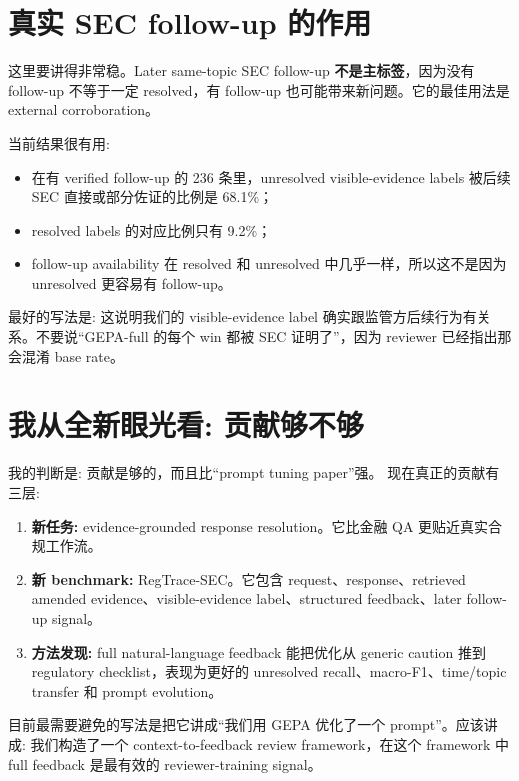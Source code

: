 \documentclass[11pt,fontset=none]{ctexart}
\newcommand{\good}[1]{\textcolor{blue!70!black}{#1}}
\begin{document}
\section*{真实 SEC follow-up 的作用}

这里要讲得非常稳。Later same-topic SEC follow-up \textbf{不是主标签}，因为没有 follow-up 不等于一定 resolved，有 follow-up 也可能带来新问题。它的最佳用法是 external corroboration。

当前结果很有用:
\begin{itemize}
    \item 在有 verified follow-up 的 236 条里，unresolved visible-evidence labels 被后续 SEC 直接或部分佐证的比例是 68.1\%；
    \item resolved labels 的对应比例只有 9.2\%；
    \item follow-up availability 在 resolved 和 unresolved 中几乎一样，所以这不是因为 unresolved 更容易有 follow-up。
\end{itemize}

最好的写法是: 这说明我们的 visible-evidence label 确实跟监管方后续行为有关系。不要说``GEPA-full 的每个 win 都被 SEC 证明了''，因为 reviewer 已经指出那会混淆 base rate。

\section*{我从全新眼光看: 贡献够不够}

我的判断是: \good{贡献是够的，而且比``prompt tuning paper''强。} 现在真正的贡献有三层:

\begin{enumerate}[leftmargin=1.6em,itemsep=0.25em]
    \item \textbf{新任务:} evidence-grounded response resolution。它比金融 QA 更贴近真实合规工作流。
    \item \textbf{新 benchmark:} RegTrace-SEC。它包含 request、response、retrieved amended evidence、visible-evidence label、structured feedback、later follow-up signal。
    \item \textbf{方法发现:} full natural-language feedback 能把优化从 generic caution 推到 regulatory checklist，表现为更好的 unresolved recall、macro-F1、time/topic transfer 和 prompt evolution。
\end{enumerate}

目前最需要避免的写法是把它讲成``我们用 GEPA 优化了一个 prompt''。应该讲成: \good{我们构造了一个 context-to-feedback review framework，在这个 framework 中 full feedback 是最有效的 reviewer-training signal。}
\end{document}
